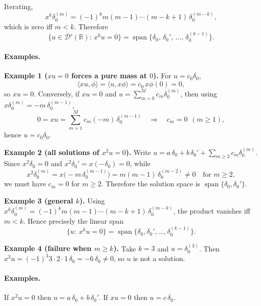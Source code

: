 \documentclass[12pt,a4paper]{article}
\theoremstyle{plain}
\theoremstyle{definition}
\theoremstyle{remark}
\theoremstyle{remark}
\begin{document}
Iterating,
\[
x^k\delta_0^{(m)}=(-1)^k m(m-1)\cdots(m-k+1)\,\delta_0^{(m-k)},
\]
which is zero iff $m<k$. Therefore
\[
\{u\in\mathcal D'(\mathbb R):\,x^k u=0\}
=\operatorname{span}\{\delta_0,\,\delta_0',\,\dots,\,\delta_0^{(k-1)}\}.
\]


\paragraph{Examples.}

\bigskip

\textbf{Example 1 ($xu=0$ forces a pure mass at $0$).}
For $u=c_0\delta_0$,
\[
\langle x u,\phi\rangle=\langle u,x\phi\rangle=c_0\,x\phi(0)=0,
\]
so $x u=0$. Conversely, if $xu=0$ and $u=\sum_{m=0}^M c_m\delta_0^{(m)}$,
then using $x\delta_0^{(m)}=-m\,\delta_0^{(m-1)}$,
\[
0=xu=\sum_{m=1}^M c_m(-m)\,\delta_0^{(m-1)}
\quad\Rightarrow\quad c_m=0\ \ (m\ge1),
\]
hence $u=c_0\delta_0$.

\medskip

\textbf{Example 2 (all solutions of $x^2 u=0$).}
Write $u=a\,\delta_0+b\,\delta_0'+\sum_{m\ge2} c_m\delta_0^{(m)}$.
Since $x^2\delta_0=0$ and $x^2\delta_0' = x(-\delta_0)=0$, while
\[
x^2\delta_0^{(m)}=x\big(-m\,\delta_0^{(m-1)}\big)
=m(m-1)\,\delta_0^{(m-2)}\neq0 \quad \text{for } m\ge2,
\]
we must have $c_m=0$ for $m\ge2$. Therefore the solution space is
$\operatorname{span}\{\delta_0,\delta_0'\}$.

\medskip

\textbf{Example 3 (general $k$).}
Using $x^k\delta_0^{(m)}=(-1)^k m(m-1)\cdots(m-k+1)\,\delta_0^{(m-k)}$, the product vanishes
iff $m<k$. Hence precisely the linear span
\[
\{u:\ x^k u=0\}=\operatorname{span}\{\delta_0,\delta_0',\dots,\delta_0^{(k-1)}\}.
\]

\medskip

\textbf{Example 4 (failure when $m\ge k$).}
Take $k=3$ and $u=\delta_0^{(3)}$. Then
$x^3 u = (-1)^3 3\cdot 2\cdot 1\,\delta_0 = -6\,\delta_0\neq 0$, so $u$ is not a solution.

\bigskip


\paragraph{Examples.}

If $x^2 u=0$ then $u=a\,\delta_0+b\,\delta_0'$. If $x u=0$ then $u=c\,\delta_0$.

\bigskip
\bigskip
\end{document}
